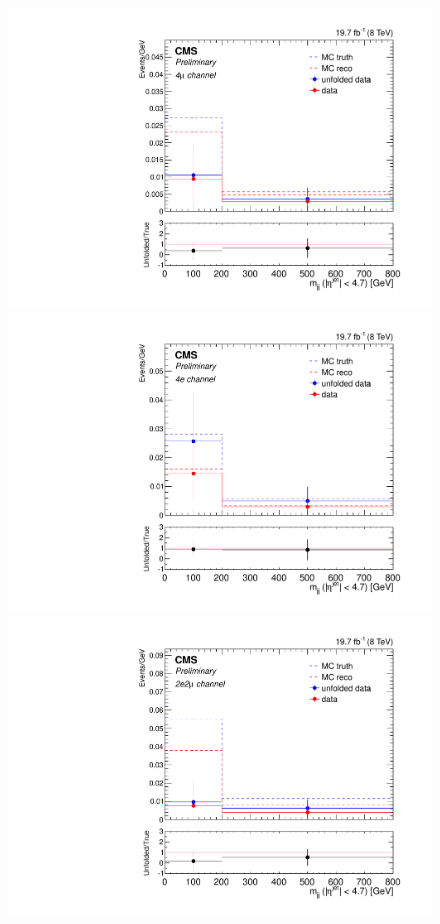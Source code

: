 \begin{figure}[hbtp]
  \begin{center}
    \includegraphics[width=\cmsFigWidth]{Figures/Mjj_ZZTo4m_Mad_fr_binwidth}
    \includegraphics[width=\cmsFigWidth]{Figures/Mjj_ZZTo4e_Mad_fr_binwidth}
    \includegraphics[width=\cmsFigWidth]{Figures/Mjj_ZZTo2e2m_Mad_fr_binwidth}   

\end{center}
\end{figure}
